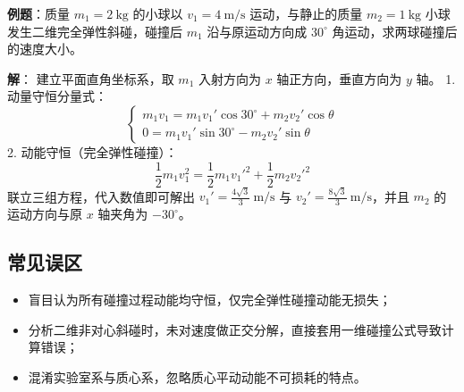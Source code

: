 \textbf{例题}：质量 \(m_1=2\ \mathrm{kg}\) 的小球以 \(v_1=4\ \mathrm{m/s}\) 运动，与静止的质量 \(m_2=1\ \mathrm{kg}\) 小球发生二维完全弹性斜碰，碰撞后 \(m_1\) 沿与原运动方向成 \(30^\circ\) 角运动，求两球碰撞后的速度大小。

\textbf{解}：
建立平面直角坐标系，取 \(m_1\) 入射方向为 \(x\) 轴正方向，垂直方向为 \(y\) 轴。
1. 动量守恒分量式：
\[
\begin{cases}
m_1 v_1 = m_1 v_1' \cos30^\circ + m_2 v_2' \cos\theta \\
0 = m_1 v_1' \sin30^\circ - m_2 v_2' \sin\theta
\end{cases}
\]
2. 动能守恒（完全弹性碰撞）：
\[
\frac{1}{2}m_1 v_1^2 = \frac{1}{2}m_1 {v_1'}^2 + \frac{1}{2}m_2 {v_2'}^2
\]
联立三组方程，代入数值即可解出 \(v_1'=\frac{4\sqrt3}{3}\ \mathrm{m/s}\) 与 \(v_2'=\frac{8\sqrt3}{3}\ \mathrm{m/s}\)，并且 $m_2$ 的运动方向与原 $x$ 轴夹角为 $-30^\circ$。

\subsection{常见误区}
\begin{itemize}
    \item 盲目认为所有碰撞过程动能均守恒，仅完全弹性碰撞动能无损失；
    \item 分析二维非对心斜碰时，未对速度做正交分解，直接套用一维碰撞公式导致计算错误；
    \item 混淆实验室系与质心系，忽略质心平动动能不可损耗的特点。
\end{itemize}
